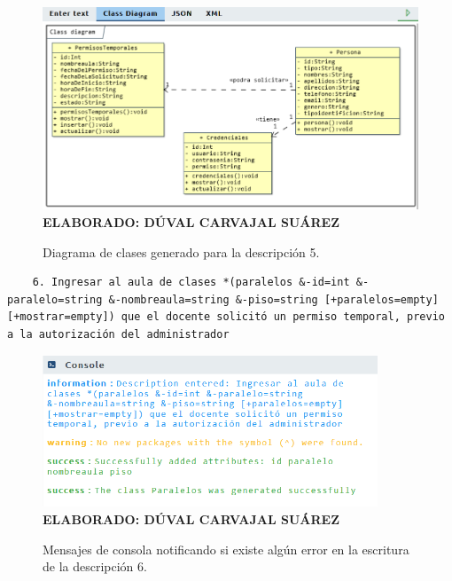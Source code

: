  \begin{figure}[H]
 	\caption{Diagrama de clases generado para la descripción 5.}
 	\includegraphics[width=15cm]{img/dc-eva-005.png}
 	\label{fig:dc_eva_005}
 	\textbf{\\ ELABORADO: DÚVAL CARVAJAL SUÁREZ}
 \end{figure}
 
 \begin{lstlisting}
 	6. Ingresar al aula de clases *(paralelos &-id=int &-paralelo=string &-nombreaula=string &-piso=string [+paralelos=empty] [+mostrar=empty]) que el docente solicitó un permiso temporal, previo a la autorización del administrador \end{lstlisting}
 
    \begin{figure}[h!]
 	\caption{Mensajes de consola notificando si existe algún error en la escritura de la descripción 6.}
 	\includegraphics[width=10cm]{img/not-eva-006.png}
 	\label{fig:not_eva_006}
 	\textbf{\\ ELABORADO: DÚVAL CARVAJAL SUÁREZ}
 \end{figure}
 
